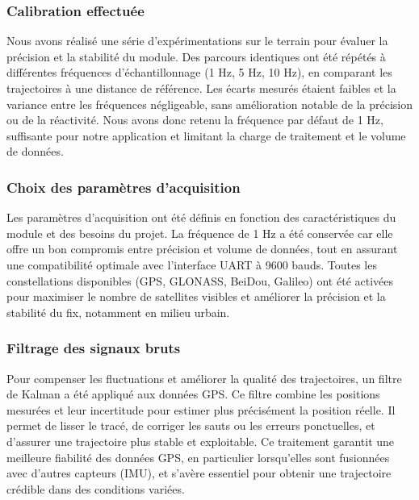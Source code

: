 \vspace{2em}

\subsubsection{Calibration effectuée}

Nous avons réalisé une série d’expérimentations sur le terrain pour évaluer la précision et la stabilité du module. Des parcours identiques ont été répétés à différentes fréquences d’échantillonnage (1 Hz, 5 Hz, 10 Hz), en comparant les trajectoires à une distance de référence. Les écarts mesurés étaient faibles et la variance entre les fréquences négligeable, sans amélioration notable de la précision ou de la réactivité.  
Nous avons donc retenu la fréquence par défaut de 1 Hz, suffisante pour notre application et limitant la charge de traitement et le volume de données.

\vspace{2em}

\subsubsection{Choix des paramètres d’acquisition}

Les paramètres d’acquisition ont été définis en fonction des caractéristiques du module et des besoins du projet. La fréquence de 1 Hz a été conservée car elle offre un bon compromis entre précision et volume de données, tout en assurant une compatibilité optimale avec l’interface UART à 9600 bauds.  
Toutes les constellations disponibles (GPS, GLONASS, BeiDou, Galileo) ont été activées pour maximiser le nombre de satellites visibles et améliorer la précision et la stabilité du fix, notamment en milieu urbain.

\vspace{2em}

\subsubsection{Filtrage des signaux bruts}

Pour compenser les fluctuations et améliorer la qualité des trajectoires, un filtre de Kalman a été appliqué aux données GPS. Ce filtre combine les positions mesurées et leur incertitude pour estimer plus précisément la position réelle. Il permet de lisser le tracé, de corriger les sauts ou les erreurs ponctuelles, et d’assurer une trajectoire plus stable et exploitable.  
Ce traitement garantit une meilleure fiabilité des données GPS, en particulier lorsqu’elles sont fusionnées avec d’autres capteurs (IMU), et s’avère essentiel pour obtenir une trajectoire crédible dans des conditions variées.


